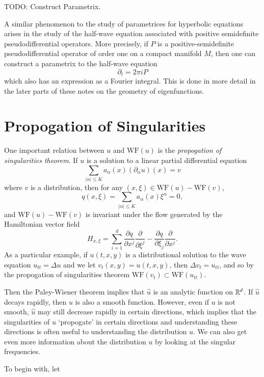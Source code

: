 TODO: Construct Parametrix.

\begin{remark}
    A similar phenomenon to the study of parametrices for hyperbolic equations arises in the study of the half-wave equation associated with positive semidefinite pseudodifferential operators. More precisely, if $P$ is a positive-semidefinite pseudodifferential operator of order one on a compact manifold $M$, then one can construct a parametrix to the half-wave equation
    \[ \partial_t = 2 \pi i P \]
    which also has an expression as a Fourier integral. This is done in more detail in the later parts of these notes on the geometry of eigenfunctions.
\end{remark}

\section{Propogation of Singularities}

One important relation between $u$ and $\text{WF}(u)$ is the \emph{propogation of singularities theorem}. If $u$ is a solution to a linear partial differential equation
%
\[ \sum_{|\alpha| \leq K} a_\alpha(x) (\partial_\alpha u)(x) = v \]
%
where $v$ is a distribution, then for any $(x,\xi) \in \text{WF}(u) - \text{WF}(v)$,
%
\[ q(x,\xi) = \sum_{|\alpha| \leq K} a_\alpha(x) \xi^\alpha = 0, \]
%
and $\text{WF}(u) - \text{WF}(v)$ is invariant under the flow generated by the Hamiltonian vector field
%
\[ H_{x,\xi} = \sum_{i = 1}^d \frac{\partial q}{\partial x^j} \frac{\partial}{\partial \xi^j} - \frac{\partial q}{\partial \xi_j} \frac{\partial}{\partial x^j}. \]
%
As a particular example, if $u(t,x,y)$ is a distributional solution to the wave equation $u_{tt} = \Delta u$ and we let $v_t(x,y) = u(t,x,y)$, then $\Delta v_t = u_{tt}$, and so by the propogation of singularities theorem $\text{WF}(v_t) \subset \text{WF}(u_{tt})$.

Then the Paley-Wiener theorem implies that $\widehat{u}$ is an analytic function on $\operatorname{\mathbb{R}}^d$. If $\widehat{u}$ decays rapidly, then $u$ is also a smooth function. However, even if $u$ is not smooth, $\widehat{u}$ may still decrease rapidly in certain directions, which implies that the singularities of $u$ `propogate' in certain directions and understanding these directions is often useful to understanding the distribution $u$. We can also get even more information about the distribution $u$ by looking at the singular frequencies.

To begin with, let 

